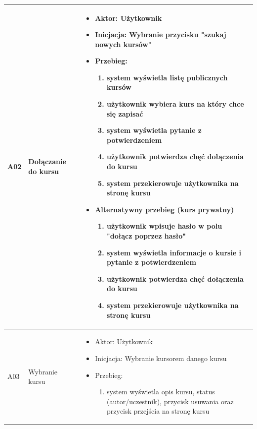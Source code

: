 \begin{longtable}{|p{1cm}|p{2cm}|p{11cm}|}
A02 & Dołączanie do kursu & \vspace{-\baselineskip}
\begin{itemize}[label={-},noitemsep,leftmargin=*,topsep=0pt,partopsep=0pt]
\item Aktor: Użytkownik
\item Inicjacja: Wybranie przycisku "szukaj nowych kursów"
\item Przebieg:
	\begin{enumerate}
		\item system wyświetla listę publicznych kursów
		\item użytkownik wybiera kurs na który chce się zapisać
		\item system wyświetla pytanie z potwierdzeniem 
		\item użytkownik potwierdza chęć dołączenia do kursu
		\item system przekierowuje użytkownika na stronę kursu
	\end{enumerate}
\item Alternatywny przebieg (kurs prywatny)
	\begin{enumerate}
		\item użytkownik wpisuje hasło w polu "dołącz poprzez hasło"
		\item system wyświetla informacje o kursie i pytanie z potwierdzeniem 
		\item użytkownik potwierdza chęć dołączenia do kursu
		\item system przekierowuje użytkownika na stronę kursu
	\end{enumerate}
\end{itemize} \\\hline
    
A03 & Wybranie kursu & \vspace{-\baselineskip}
\begin{itemize}[label={-},noitemsep,leftmargin=*,topsep=0pt,partopsep=0pt]
\item Aktor: Użytkownik
\item Inicjacja: Wybranie kursorem danego kursu
\item Przebieg:
	\begin{enumerate}
		\item system wyświetla opis kursu, status (autor/uczestnik), przycisk usuwania oraz przycisk przejścia na stronę kursu
	\end{enumerate}
\end{itemize} \\ \hline


\end{longtable}
